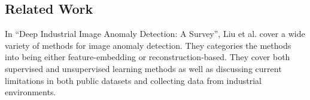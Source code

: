 \subsection{Related Work}

In ``Deep Industrial Image Anomaly Detection: A Survey'', Liu et al. cover a wide variety of methods for image anomaly detection. They categories the methods into being either feature-embedding or reconstruction-based. They cover both supervised and unsupervised learning methods as well as discussing current limitations in both public datasets and collecting data from industrial environments. 
\par
